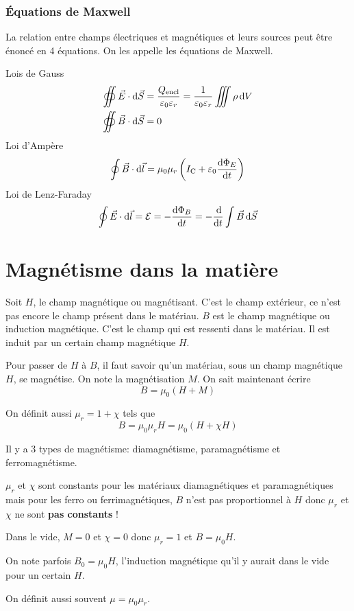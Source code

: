 \section{Équations de Maxwell}
La relation entre champs électriques et magnétiques et leurs sources peut être énoncé en 4 équations.
On les appelle les équations de Maxwell.

Lois de Gauss
\begin{align*}
	\oiint \vec E \cdot \operatorname{d}\! \vec S &= \frac{Q_\mathrm{encl}}{\varepsilon_0\varepsilon_r} = \frac{1}{\varepsilon_0\varepsilon_r}\iiint \rho \operatorname{d}\! V\\
	\oiint \vec B \cdot \operatorname{d}\! \vec S &= 0
\end{align*}
Loi d'Ampère
\[ \oint \vec B \cdot \operatorname{d}\! \vec l = \mu_0\mu_r \left(I_\mathrm{C} + \varepsilon_0 \frac{\operatorname{d}\! \Phi_E}{\operatorname{d}\! t}\right) \]%
Loi de Lenz-Faraday
\[ \oint \vec E \cdot \operatorname{d}\! \vec l = \mathcal{E} = - \frac{\operatorname{d}\! \Phi_B}{\operatorname{d}\! t} = - \frac{\operatorname{d}\!}{\operatorname{d}\! t}\int \vec B \operatorname{d}\! \vec S \]

\part{Magnétisme dans la matière}
Soit $H$, le champ magnétique ou magnétisant.
C'est le champ extérieur, ce n'est pas encore le champ présent dans le matériau.
$B$ est le champ magnétique ou induction magnétique.
C'est le champ qui est ressenti dans le matériau.
Il est induit par un certain champ magnétique $H$.

Pour passer de $H$ à $B$, il faut savoir qu'un matériau, sous un champ magnétique $H$, se magnétise.
On note la magnétisation $M$.
On sait maintenant écrire
\[ B = \mu_0 (H + M) \]

On définit aussi $\mu_r = 1 + \chi$ tels que
\[ B = \mu_0\mu_r H = \mu_0 (H + \chi H) \]

Il y a 3 types de magnétisme: diamagnétisme, paramagnétisme et ferromagnétisme.

$\mu_r$ et $\chi$ sont constants pour les matériaux diamagnétiques et paramagnétiques mais pour les ferro ou ferrimagnétiques, $B$ n'est pas proportionnel à $H$ donc $\mu_r$ et $\chi$ ne sont \textbf{pas constants} !

Dans le vide, $M = 0$ et $\chi = 0$ donc $\mu_r = 1$ et $B = \mu_0 H$.

On note parfois $B_0 = \mu_0 H$, l'induction magnétique qu'il y aurait dans le vide pour un certain $H$.

On définit aussi souvent $\mu = \mu_0 \mu_r$.

